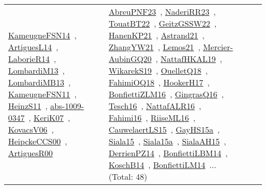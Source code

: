 {\begin{longtable}{lp{3cm}>{\raggedright\arraybackslash}p{6cm}>{\raggedright\arraybackslash}p{6cm}>{\raggedright\arraybackslash}p{8cm}}
\href{../works/KameugneFSN14.pdf}{KameugneFSN14}~\cite{KameugneFSN14}, \href{../works/ArtiguesL14.pdf}{ArtiguesL14}~\cite{ArtiguesL14}, \href{../works/LaborieR14.pdf}{LaborieR14}~\cite{LaborieR14}, \href{../works/LombardiM13.pdf}{LombardiM13}~\cite{LombardiM13}, \href{../works/LombardiMB13.pdf}{LombardiMB13}~\cite{LombardiMB13}, \href{../works/KameugneFSN11.pdf}{KameugneFSN11}~\cite{KameugneFSN11}, \href{../works/HeinzS11.pdf}{HeinzS11}~\cite{HeinzS11}, \href{../works/abs-1009-0347.pdf}{abs-1009-0347}~\cite{abs-1009-0347}, \href{../works/KeriK07.pdf}{KeriK07}~\cite{KeriK07}, \href{../works/KovacsV06.pdf}{KovacsV06}~\cite{KovacsV06}, \href{../works/HeipckeCCS00.pdf}{HeipckeCCS00}~\cite{HeipckeCCS00}, \href{../works/ArtiguesR00.pdf}{ArtiguesR00}~\cite{ArtiguesR00} & \href{../works/AbreuPNF23.pdf}{AbreuPNF23}~\cite{AbreuPNF23}, \href{../works/NaderiRR23.pdf}{NaderiRR23}~\cite{NaderiRR23}, \href{../works/TouatBT22.pdf}{TouatBT22}~\cite{TouatBT22}, \href{../works/GeitzGSSW22.pdf}{GeitzGSSW22}~\cite{GeitzGSSW22}, \href{../works/HanenKP21.pdf}{HanenKP21}~\cite{HanenKP21}, \href{../works/Astrand21.pdf}{Astrand21}~\cite{Astrand21}, \href{../works/ZhangYW21.pdf}{ZhangYW21}~\cite{ZhangYW21}, \href{../works/Lemos21.pdf}{Lemos21}~\cite{Lemos21}, \href{../works/Mercier-AubinGQ20.pdf}{Mercier-AubinGQ20}~\cite{Mercier-AubinGQ20}, \href{../works/NattafHKAL19.pdf}{NattafHKAL19}~\cite{NattafHKAL19}, \href{../works/WikarekS19.pdf}{WikarekS19}~\cite{WikarekS19}, \href{../works/OuelletQ18.pdf}{OuelletQ18}~\cite{OuelletQ18}, \href{../works/FahimiOQ18.pdf}{FahimiOQ18}~\cite{FahimiOQ18}, \href{../works/HookerH17.pdf}{HookerH17}~\cite{HookerH17}, \href{../works/BonfiettiZLM16.pdf}{BonfiettiZLM16}~\cite{BonfiettiZLM16}, \href{../works/GingrasQ16.pdf}{GingrasQ16}~\cite{GingrasQ16}, \href{../works/Tesch16.pdf}{Tesch16}~\cite{Tesch16}, \href{../works/NattafALR16.pdf}{NattafALR16}~\cite{NattafALR16}, \href{../works/Fahimi16.pdf}{Fahimi16}~\cite{Fahimi16}, \href{../works/RiiseML16.pdf}{RiiseML16}~\cite{RiiseML16}, \href{../works/CauwelaertLS15.pdf}{CauwelaertLS15}~\cite{CauwelaertLS15}, \href{../works/GayHS15a.pdf}{GayHS15a}~\cite{GayHS15a}, \href{../works/Siala15.pdf}{Siala15}~\cite{Siala15}, \href{../works/Siala15a.pdf}{Siala15a}~\cite{Siala15a}, \href{../works/SialaAH15.pdf}{SialaAH15}~\cite{SialaAH15}, \href{../works/DerrienPZ14.pdf}{DerrienPZ14}~\cite{DerrienPZ14}, \href{../works/BonfiettiLBM14.pdf}{BonfiettiLBM14}~\cite{BonfiettiLBM14}, \href{../works/KoschB14.pdf}{KoschB14}~\cite{KoschB14}, \href{../works/BonfiettiLM14.pdf}{BonfiettiLM14}~\cite{BonfiettiLM14}... (Total: 48)\\

\end{longtable}}
